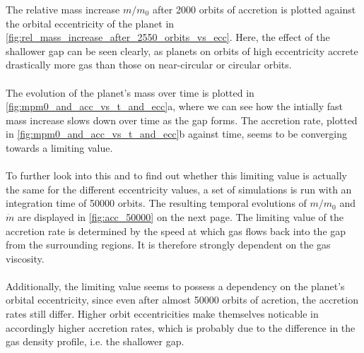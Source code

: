         \clearpage \noindent
        The relative mass increase $m/m_0$ after 2000 orbits of accretion is 
        plotted against the orbital eccentricity of the planet in 
        \autoref{fig:rel_mass_increase_after_2550_orbits_vs_ecc}. Here, the 
        effect of the shallower gap can be seen clearly, as planets on orbits 
        of high eccentricity accrete drastically more gas than those on 
        near-circular or circular orbits. \\
        \\
        The evolution of the planet's mass over time is plotted in 
        \autoref{fig:mpm0_and_acc_vs_t_and_ecc}a, where we can see how the 
        intially fast mass increase slows down over time as the gap forms. The 
        accretion rate, plotted in \autoref{fig:mpm0_and_acc_vs_t_and_ecc}b 
        against time, seems to be converging towards a limiting value. \\
        \\
        To further look into this and to find out whether this limiting 
        value is actually the same for the different eccentricity values,
        a set of simulations is run with an 
        integration time of 50000 orbits. The resulting temporal evolutions 
        of $m/m_0$ and $\dot{m}$ are displayed in \autoref{fig:acc_50000} on 
        the next page. The limiting value of the accretion rate is determined 
        by the speed at which gas flows back into the gap from the 
        surrounding regions. It is therefore strongly dependent on the 
        gas viscosity. \\
        \\
        Additionally, the limiting value seems to possess a dependency on 
        the planet's orbital eccentricity, since even after almost 50000 orbits 
        of acretion, the accretion rates still differ. Higher orbit 
        eccentricities make themselves noticable in accordingly higher 
        accretion rates, which is probably due to the difference in the 
        gas density profile, i.e. the shallower gap. \\
        \\
        \\
